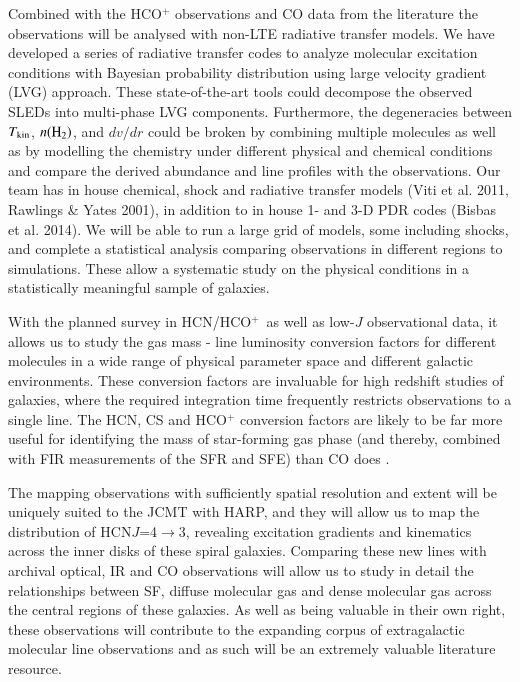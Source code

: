 \documentclass[legal,11pt]{article}
\def\,{\thinspace}
\def\Tkin{$T_{\rm kin}$}
\def\nHtwo{$n({\rm H}_2)$}
\def\HCOP       {HCO$^{+}$}
\def\HCNft        {HCN\,$J$=4$\rightarrow$3}
\begin{document}
Combined with the HCO$^+$ observations and CO data from the literature the
observations will be analysed with non-LTE radiative transfer models. We have
developed a series of radiative transfer codes \citep[e.g.,][]{Zhang2014aa,
Tunnard2015} to analyze molecular excitation conditions with Bayesian
probability distribution using large velocity gradient (LVG) approach. These
state-of-the-art tools could decompose the observed SLEDs  into multi-phase LVG
components. Furthermore, the degeneracies between \Tkin, \nHtwo, and $dv/dr$
could be broken by combining multiple molecules as well as by modelling the
chemistry under different physical and chemical conditions and compare the
derived abundance and line profiles with the observations.  Our team has in
house chemical, shock and radiative transfer models (Viti et al. 2011, Rawlings
\& Yates 2001), in addition to in house 1- and 3-D PDR codes (Bisbas et al.
2014).  We will be able to run a large grid of models, some including shocks,
and complete a statistical analysis comparing observations in different regions
to simulations.  These allow a systematic study on the physical conditions in a
statistically meaningful sample of galaxies.

With the planned survey in HCN/\HCOP\ as well as low-$J$ observational data, it
allows us to study the gas mass - line luminosity conversion factors for
different molecules in a wide range of physical parameter space and different
galactic environments. These conversion factors are invaluable for high
redshift studies of galaxies, where the required integration time frequently
restricts observations to a single line.  The HCN, CS and HCO$^+$ conversion
factors are likely to be far more useful for identifying the mass of
star-forming gas phase (and thereby, combined with FIR measurements of the SFR
and SFE) than CO does \citep[e.g.,][]{zgh2014}. 

The mapping observations with sufficiently spatial resolution and extent will
be uniquely suited to the JCMT with HARP, and they will allow us to map the
distribution of \HCNft, revealing excitation gradients and kinematics across
the inner disks of these spiral galaxies.  Comparing these new lines with
archival optical, IR and CO observations will allow us to study in detail the
relationships between SF, diffuse molecular gas and dense molecular gas across
the central regions of these galaxies.  As well as being valuable in their own
right, these observations will contribute to the expanding corpus of
extragalactic molecular line observations and as such will be an extremely
valuable literature resource.
\end{document}
